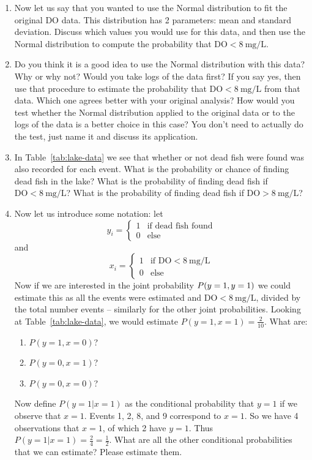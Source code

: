 \documentclass[paper=letter, fontsize=11pt]{scrartcl}
\numberwithin{equation}{section}
\numberwithin{figure}{section}
\numberwithin{table}{section}
\begin{document}
\begin{enumerate}[resume]
  \item Now let us say that you wanted to use the Normal distribution to fit the original DO data.
  This distribution has 2 parameters: mean and standard deviation.
  Discuss which values you would use for this data, and then use the Normal distribution to compute the probability that $\text{DO}<\SI{8}{\milli\gram\per\liter}$.
  \item Do you think it is a good idea to use the Normal distribution with this data?
  Why or why not?
  Would you take logs of the data first?
  If you say yes, then use that procedure to estimate the probability that $\text{DO}<\SI{8}{\milli\gram\per\liter}$ from that data.
  Which one agrees better with your original analysis?
  How would you test whether the Normal distribution applied to the original data or to the logs of the data is a better choice in this case?
  You don’t need to actually do the test, just name it and discuss its application.
  \item In Table~\ref{tab:lake-data} we see that whether or not dead fish were found was also recorded for each event.
  What is the probability or chance of finding dead fish in the lake? What is the probability of finding dead fish if $\text{DO}<\SI{8}{\milli\gram\per\liter}$?
  What is the probability of finding dead fish if $\text{DO}>\SI{8}{\milli\gram\per\liter}$?
  \item Now let us introduce some notation: let
  \begin{equation}
    y_i = \begin{cases}1 & \text{if dead fish found} \\ 0 & \text{else} \end{cases}
  \end{equation}
  and
  \begin{equation}
    x_i = \begin{cases}1 & \text{if DO}<\SI{8}{\milli\gram\per\liter}\\ 0 & \text{else} \end{cases}
  \end{equation}
  Now if we are interested in the joint probability $P\qty(y=1,y=1)$ we could estimate this as all the events were estimated and $\text{DO}<\SI{8}{\milli\gram\per\liter}$, divided by the total number events -- similarly for the other joint probabilities.
  Looking at Table~\ref{tab:lake-data}, we would estimate $P(y=1,x=1)=\frac{2}{10}$.
  What are:
  \begin{enumerate}
    \item $P(y=1,x=0)$?
    \item $P(y=0, x=1)$?
    \item $P(y=0, x=0)$?
  \end{enumerate}
  Now define $P(y=1 | x=1)$ as the conditional probability that $y=1$ if we observe that $x=1$.
  Events 1, 2, 8, and 9 correspond to $x=1$.
  So we have 4 observations that $x=1$, of which 2 have $y=1$.
  Thus $P(y=1 | x=1) = \frac{2}{4} = \frac{1}{2}$.
  What are all the other conditional probabilities that we can estimate?
  Please estimate them.


\end{enumerate}
\end{document}

